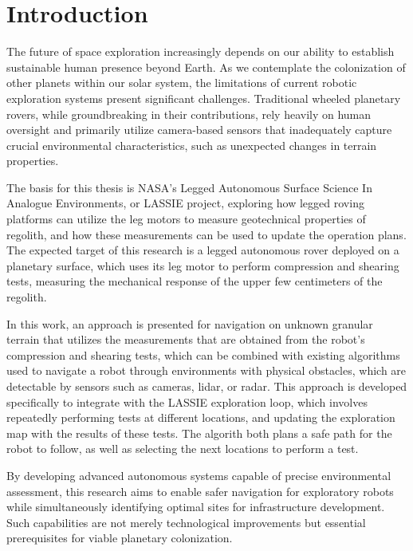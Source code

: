 \chapter{\leavevmode \newline Introduction}
\label{chap:Introduction}


The future of space exploration increasingly depends on our ability to establish sustainable human presence beyond Earth. As we contemplate the colonization of other planets within our solar system, the limitations of current robotic exploration systems present significant challenges. Traditional wheeled planetary rovers, while groundbreaking in their contributions, rely heavily on human oversight and primarily utilize camera-based sensors that inadequately capture crucial environmental characteristics, such as unexpected changes in terrain properties.

The basis for this thesis is NASA's Legged Autonomous Surface Science In Analogue Environments, or LASSIE \cite{Fisher2023LASSIE} project, exploring how legged roving platforms can utilize the leg motors to measure geotechnical properties of regolith, and how these measurements can be used to update the operation plans. The expected target of this research is a legged autonomous rover deployed on a planetary surface, which uses its leg motor to perform compression and shearing tests, measuring the mechanical response of the upper few centimeters of the regolith.

In this work, an approach is presented for navigation on unknown granular terrain that utilizes the measurements that are obtained from the robot's compression and shearing tests, which can be combined with existing algorithms used to navigate a robot through environments with physical obstacles, which are detectable by sensors such as cameras, lidar, or radar. This approach is developed specifically to integrate with the LASSIE exploration loop, which involves repeatedly performing tests at different locations, and updating the exploration map with the results of these tests. The algorith both plans a safe path for the robot to follow, as well as selecting the next locations to perform a test.

By developing advanced autonomous systems capable of precise environmental assessment, this research aims to enable safer navigation for exploratory robots while simultaneously identifying optimal sites for infrastructure development. Such capabilities are not merely technological improvements but essential prerequisites for viable planetary colonization.


